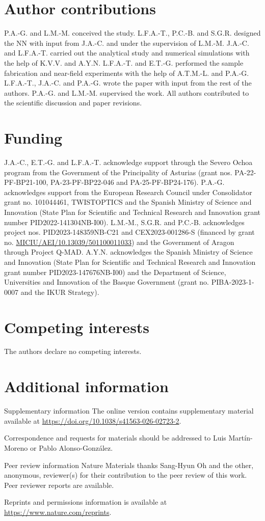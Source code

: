 \section*{Author contributions}

P.A.-G. and L.M.-M. conceived the study. L.F.A.-T., P.C.-B. and S.G.R. designed the NN with input from J.A.-C. and under the supervision of L.M.-M. J.A.-C. and L.F.A.-T. carried out the analytical study and numerical simulations with the help of K.V.V. and A.Y.N. L.F.A.-T. and E.T.-G. performed the sample fabrication and near-field experiments with the help of A.T.M.-L. and P.A.-G. L.F.A.-T., J.A.-C. and P.A.-G. wrote the paper with input from the rest of the authors. P.A.-G. and L.M.-M. supervised the work. All authors contributed to the scientific discussion and paper revisions.

\section*{Funding}

J.A.-C., E.T.-G. and L.F.A.-T. acknowledge support through the Severo Ochoa program from the Government of the Principality of Asturias (grant nos. PA-22-PF-BP21-100, PA-23-PF-BP22-046 and PA-25-PF-BP24-176). P.A.-G. acknowledges support from the European Research Council under Consolidator grant no. 101044461, TWISTOPTICS and the Spanish Ministry of Science and Innovation (State Plan for Scientific and Technical Research and Innovation grant number PID2022-141304NB-I00). L.M.-M., S.G.R. and P.C.-B. acknowledges project nos. PID2023-148359NB-C21 and CEX2023-001286-S (financed by grant no. \url{MICIU/AEI/10.13039/501100011033}) and the Government of Aragon through Project Q-MAD. A.Y.N. acknowledges the Spanish Ministry of Science and Innovation (State Plan for Scientific and Technical Research and Innovation grant number PID2023-147676NB-I00) and the Department of Science, Universities and Innovation of the Basque Government (grant no. PIBA-2023-1-0007 and the IKUR Strategy).

\section*{Competing interests}

The authors declare no competing interests.

\section*{Additional information}

Supplementary information The online version contains supplementary material available at \url{https://doi.org/10.1038/s41563-026-02723-2}.

Correspondence and requests for materials should be addressed to Luis Martín-Moreno or Pablo Alonso-González.

Peer review information Nature Materials thanks Sang-Hyun Oh and the other, anonymous, reviewer(s) for their contribution to the peer review of this work. Peer reviewer reports are available.

Reprints and permissions information is available at \url{https://www.nature.com/reprints}.

\clearpage